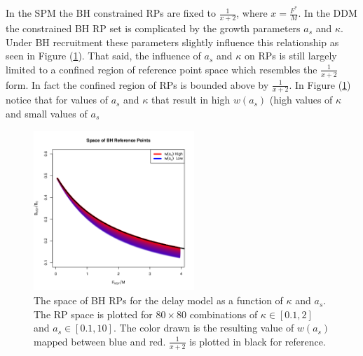 %
In the SPM the BH constrained RPs are fixed to $\frac{1}{x+2}$, where $x=\frac{F^*}{M}$.
In the DDM the constrained BH RP set is complicated by the growth parameters 
$a_s$ and $\kappa$. Under BH recruitment these parameters slightly %
influence this relationship as seen in Figure (\ref{rpSpace}). That said,
the influence of $a_s$ and $\kappa$ on RPs is still largely limited to a
confined region of reference point space which resembles the $\frac{1}{x+2}$
form. In fact the confined region of RPs is bounded above by $\frac{1}{x+2}$. %
In Figure (\ref{rpSpace}) notice that for values of $a_s$ and $\kappa$ that
result in high $w(a_s)$ (high values of $\kappa$ and small values of $a_s$ %
%
\begin{figure} %
\includegraphics[width=0.54\textwidth]{../ddBias/rpSpaceww.png}
\vspace{-1.5cm}
\caption{
The space of BH RPs for the delay model as a function of $\kappa$ and $a_s$.
The RP space is plotted for $80\times80$ combinations of $\kappa\in[0.1, 2]$
and $a_s\in[0.1, 10]$. The color drawn is the resulting value of $w(a_s)$
mapped between blue and red.
$\frac{1}{x+2}$ is plotted in black for reference.
%
}
\label{rpSpace}
\end{figure}
